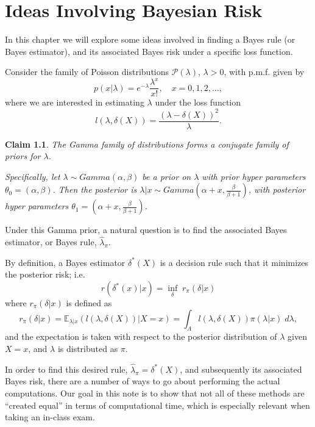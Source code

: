 \documentclass[11pt]{report}
\newtheorem{claim}{Claim}
\begin{document}


\chapter{Ideas Involving Bayesian Risk}

In this chapter we will explore some ideas involved in finding a Bayes rule (or Bayes estimator), and its associated Bayes risk under a specific loss function. 


Consider the family of Poisson distributions $\mathcal{P}(\lambda)$, $\lambda>0$, with p.m.f. given by 
$$p(x|\lambda) = e^{-\lambda}\frac{\lambda^x}{x!}, \quad x=0,1,2, \dots, $$
where we are interested in estimating $\lambda$ under the loss function
\begin{equation} \label{eq:loss}
l(\lambda,\delta(X)) = \frac{(\lambda-\delta(X))^2}{\lambda}.
\end{equation}
	
\begin{claim}
The Gamma family of distributions forms a conjugate family of priors for $\lambda$.
		
Specifically, let $\lambda \sim Gamma(\alpha,\beta)$ be a prior on $\lambda$ with prior hyper parameters $\theta_0 = (\alpha,\beta)$. Then the posterior is $\lambda|x \sim Gamma\left(\alpha+x, \frac{\beta}{\beta+1}\right)$, with posterior hyper parameters $\theta_1 = \left(\alpha+x, \frac{\beta}{\beta+1}\right)$. 
\end{claim}
		
Under this Gamma prior, a natural question is to find the associated Bayes estimator, or Bayes rule, $\widehat{\lambda}_\pi$.

By definition, a Bayes estimator $\delta^*(X)$ is a decision rule such that it minimizes the posterior risk; i.e.  
$$r(\delta^*(x)|x) = \inf_{\delta}\; r_\pi(\delta|x) $$
where $r_\pi(\delta|x)$ is defined as 
\begin{equation}\label{eq:postrisk}
r_\pi(\delta|x) = \mathbb{E}_{\lambda|x}(l(\lambda,\delta(X))|X=x) = \int_\Lambda l(\lambda,\delta(X)) \pi(\lambda|x) \; d\lambda,
\end{equation}
and the expectation is taken with respect to the posterior distribution of $\lambda$ given $X=x$, and $\lambda$ is distributed as $\pi$. 

In order to find this desired rule, $\widehat{\lambda}_\pi = \delta^*(X)$, and subsequently its associated Bayes risk, there are a number of ways to go about performing the actual computations. Our goal in this note is to show that not all of these methods are ``created equal'' in terms of computational time, which is especially relevant when taking an in-class exam. \newline
\end{document}
